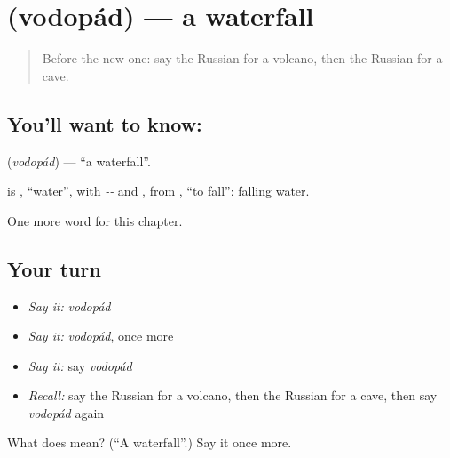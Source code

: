 \section[\texorpdfstring{\ru{водопад} (vodopád)}{водопад (vodopád)}]{ (vodopád) — a waterfall}

\label{lesson:RU-C116-waterfall}



\begin{quote}
Before the new one: say the Russian for a volcano, then the Russian for a cave.
\end{quote}

\subsection*{You'll want to know: }
\textbf{} (\emph{vodopád}) — \textquotedblleft{}a waterfall\textquotedblright{}.

\begin{cousinweb}
\textbf{} is \emph{}, \textquotedblleft{}water\textquotedblright{}, with \emph{--} and \emph{}, from \emph{}, \textquotedblleft{}to fall\textquotedblright{}: falling water.
\end{cousinweb}

\begin{grammarlens}[title={What you've built}]
One more word for this chapter.
\end{grammarlens}

\subsection*{Your turn}
\begin{itemize}
\raggedright
  \item \emph{Say it:} \emph{vodopád}
  \item \emph{Say it:} \emph{vodopád}, once more
  \item \emph{Say it:} say \emph{vodopád}
  \item \emph{Recall:} say the Russian for a volcano, then the Russian for a cave, then say \emph{vodopád} again
\end{itemize}

\begin{tcolorbox}[breakable,colback=teal!4,colframe=teal!35!black,title={Before you move on}]
What does  mean? (\textquotedblleft{}A waterfall\textquotedblright{}.) Say it once more.
\end{tcolorbox}
